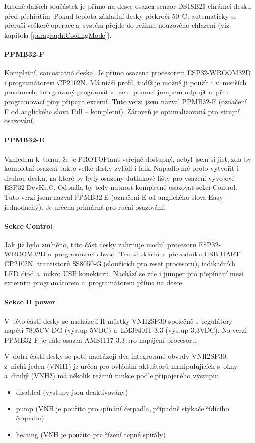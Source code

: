 Kromě dalších součástek je přímo na desce osazen senzor DS18B20 chránící desku před přehřátím. 
Pokud teplota základní desky překročí 50~\degree C, automaticky se přeruší veškeré operace a~systém přejde do režimu nouzového chlazení (viz kapitola \ref{paragraph:CoolingMode}).

\paragraph{PPMB32-F}
Kompletní, samostatná deska. 
Je přímo osazena procesorem ESP32-WROOM32D i programátorem CP2102N. 
Má nižší profil, tudíž je možné ji použít i v~menších prostorech.
Integrovaný programátor lze s~pomocí jumperů odpojit a~přes programovací piny připojit externí. Tuto verzi jsem nazval PPMB32-F (označení F od anglického slova Full -- kompletní).
Zároveň je optimalizovaná pro strojní osazování.

\paragraph{PPMB32-E}
Vzhledem k~tomu, že je PROTOPlant veřejně dostupný, nebyl jsem si jist, zda by kompletní osazení takto velké desky zvládl i laik. 
Napadlo mě proto vytvořit i druhou desku, na které by byly osazeny dutinkové lišty pro vsazení vývojové ESP32 DevKitC. 
Odpadla by tedy nutnost kompletně osazovat sekci Control. 
Tuto verzi jsem nazval PPMB32-E (označení E od anglického slova Easy -- jednoduchý).
Je určena primárně pro ruční osazování.

\paragraph{Sekce Control}
Jak již bylo zmíněno, tato část desky zahrnuje modul procesoru ESP32-WROOM32D a~programovací obvod. 
Ten se skládá z~převod\-ní\-ku USB-UART CP2102N, tranzistorů SS8050-G (sloužících pro reset procesoru), indikačních LED diod a~mikro USB konektoru. 
Nachází se zde i jumper pro přepínání mezi externím programátorem a~programátorem přímo na desce.

\paragraph{Sekce H-power}
V~této části desky se nacházejí H-můstky VNH2SP30 společně s~regulátory napětí 7805CV-DG (výstup 5VDC) a~LM3940IT-3.3 (výstup 3,3VDC). 
Na verzi PPMB32-F je dále osazen AMS1117-3.3 pro napájení procesoru. 

V~dolní části desky se poté nacházejí dva integrované obvody VNH2SP30, z~nichž jeden (VNH1) je určen pro ovládání aktuátorů manipulujících s~okny a~druhý 
(VNH2) má několik režimů funkce podle připojeného výstupu:
\begin{itemize}
    \item disabled (výstupy jsou deaktivovány)
    \item pump (VNH je použito pro spínání čerpadla, případně stykače řídícího čerpadlo)
    \item heating (VNH je použito pro řízení topné spirály)
\end{itemize}

